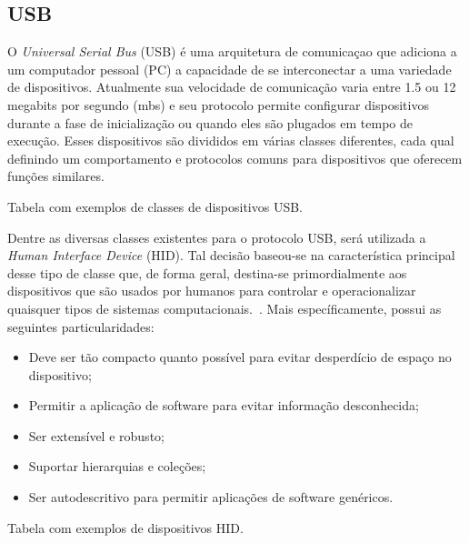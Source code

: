 \subsection{USB}
O \emph{Universal Serial Bus} (USB) é uma arquitetura de comunicaçao que adiciona a um computador pessoal (PC) a capacidade de se interconectar a uma variedade de dispositivos. Atualmente sua velocidade de comunicação varia entre 1.5 ou 12 megabits por segundo (mbs) e seu protocolo permite configurar dispositivos durante a fase de inicialização ou quando eles são plugados em tempo de execução. Esses dispositivos são divididos em várias classes diferentes, cada qual definindo um comportamento e protocolos comuns para dispositivos que oferecem funções similares.~\cite{USB}

Tabela com exemplos de classes de dispositivos USB.

Dentre as diversas classes existentes para o protocolo USB, será utilizada a \emph{Human Interface Device} (HID). Tal decisão baseou-se na característica principal desse tipo de classe que, de forma geral, destina-se primordialmente aos dispositivos que são usados por humanos para controlar e operacionalizar quaisquer tipos de sistemas computacionais.~\cite{USB}. Mais específicamente, possui as seguintes particularidades:

\begin{itemize}
\item Deve ser tão compacto quanto possível para evitar desperdício de espaço no dispositivo;
\item Permitir a aplicação de software para evitar informação desconhecida;
\item Ser extensível e robusto;
\item Suportar hierarquias e coleções;
\item Ser autodescritivo para permitir aplicações de software genéricos.
\end{itemize}

Tabela com exemplos de dispositivos HID.